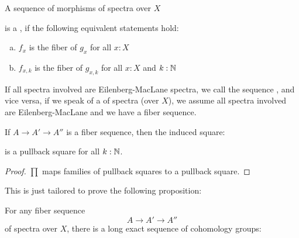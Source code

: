 \begin{definition}
  A sequence of morphisms of spectra over $X$
  \begin{center}
  \end{center}
  is a , if the following equivalent statements hold:
  \begin{enumerate}[(a)]
  \item $f_x$ is the fiber of $g_x$ for all $x:X$
  \item $f_{x,k}$ is the fiber of $g_{x,k}$ for all $x:X$ and $k:\mathbb{N}$
  \end{enumerate}
  If all spectra involved are Eilenberg-MacLane spectra, we call the sequence , and vice versa,
  if we speak of a  of spectra (over $X$), we assume all spectra involved are Eilenberg-MacLane and we have a fiber sequence.
\end{definition}

\begin{lemma}
  If $A\to A'\to A''$ is a fiber sequence, then the induced square:
  \begin{center}
  \end{center}
  is a pullback square for all $k:\mathbb{N}$.
\end{lemma}
\begin{proof}
  $\prod$ maps families of pullback squares to a pullback square.
\end{proof}

This is just tailored to prove the following proposition:

\begin{proposition}
\label{EM-les}
  For any fiber sequence
  \[ A\to A'\to A'' \]
  of spectra over $X$, there is a long exact sequence of cohomology groups:
  \begin{center}
  \end{center}
\end{proposition}

